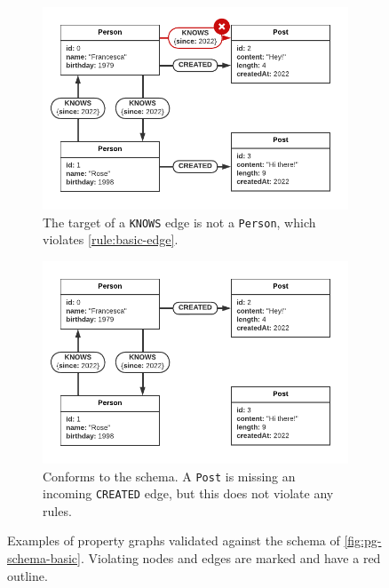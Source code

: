 \documentclass{report}
\theoremstyle{definition}
\begin{document}
\begin{figure}[t]
  \begin{subfigure}[t]{0.45\textwidth}
    \centering
    \includegraphics[width=\textwidth]{figures/conformance-basic-edge-target.pdf}
    \caption{The target of a \texttt{KNOWS} edge is not a \texttt{Person}, which violates \autoref{rule:basic-edge}.}
    \label{fig:conformance-basic-edge-target}
  \end{subfigure}
  \hfill
  \begin{subfigure}[t]{0.45\textwidth}
    \centering
    \includegraphics[width=\textwidth]{figures/conformance-basic-in.pdf}
    \caption{Conforms to the schema. A \texttt{Post} is missing an incoming \texttt{CREATED} edge, but this does not violate any rules.}
    \label{fig:conformance-basic-in}
  \end{subfigure}

  \caption[Property graphs validated against \autoref{fig:pg-schema-basic}]{Examples of property graphs validated against the schema of \autoref{fig:pg-schema-basic}. Violating nodes and edges are marked and have a red outline.}
  \label{fig:conformance-basic}
\end{figure}
\end{document}
